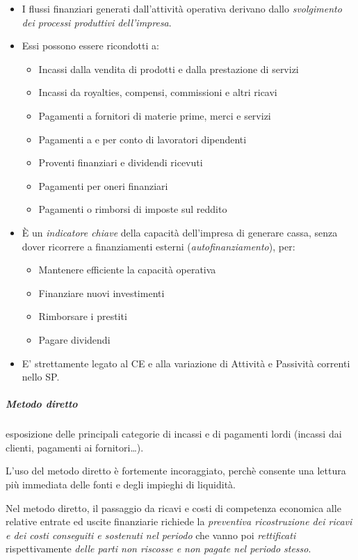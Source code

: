 \begin{itemize}
\item I flussi finanziari generati dall’attività operativa derivano dallo
\emph{svolgimento dei processi produttivi dell’impresa}.
\item Essi possono essere ricondotti a:
\begin{itemize}
    \item Incassi dalla vendita di prodotti e dalla prestazione di servizi
    \item Incassi da royalties, compensi, commissioni e altri ricavi
    \item Pagamenti a fornitori di materie prime, merci e servizi
    \item Pagamenti a e per conto di lavoratori dipendenti
    \item Proventi finanziari e dividendi ricevuti
    \item Pagamenti per oneri finanziari
    \item Pagamenti o rimborsi di imposte sul reddito
\end{itemize}

\item È un \emph{indicatore chiave} della capacità dell’impresa di generare cassa,
senza dover ricorrere a finanziamenti esterni (\emph{autofinanziamento}), per:
\begin{itemize}
    \item Mantenere efficiente la capacità operativa
    \item Finanziare nuovi investimenti
    \item Rimborsare i prestiti
    \item Pagare dividendi
\end{itemize}

\item E’ strettamente legato al CE e alla variazione di Attività e Passività correnti
nello SP.
\end{itemize}

\subparagraph{Metodo diretto}
esposizione delle principali categorie di incassi e di
pagamenti lordi (incassi dai clienti, pagamenti ai fornitori\dots).

L'uso del metodo diretto è fortemente incoraggiato, perchè consente
una lettura più immediata delle fonti e degli impieghi di liquidità.

Nel metodo diretto, il passaggio da ricavi e costi di competenza economica
alle relative entrate ed uscite finanziarie richiede la
\emph{preventiva ricostruzione dei ricavi e dei costi conseguiti e sostenuti nel periodo}
che vanno poi \emph{rettificati} rispettivamente
\emph{delle parti non riscosse e non pagate nel periodo stesso}.

